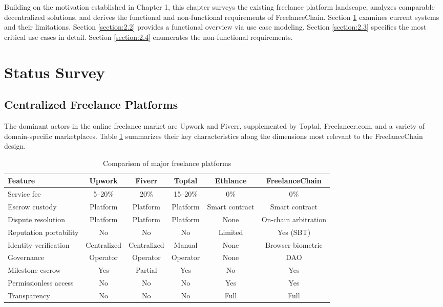 Building on the motivation established in Chapter 1, this chapter surveys the existing freelance platform landscape, analyzes comparable decentralized solutions, and derives the functional and non-functional requirements of FreelanceChain. Section \ref{section:2.1} examines current systems and their limitations. Section \ref{section:2.2} provides a functional overview via use case modeling. Section \ref{section:2.3} specifies the most critical use cases in detail. Section \ref{section:2.4} enumerates the non-functional requirements.

\section{Status Survey}
\label{section:2.1}

\subsection{Centralized Freelance Platforms}

The dominant actors in the online freelance market are Upwork and Fiverr, supplemented by Toptal, Freelancer.com, and a variety of domain-specific marketplaces. Table \ref{table:platform_comparison} summarizes their key characteristics along the dimensions most relevant to the FreelanceChain design.

\begin{table}[H]
\centering
\caption{Comparison of major freelance platforms}
\label{table:platform_comparison}
\begin{tabular}{|l|c|c|c|c|c|}
\hline
\textbf{Feature} & \textbf{Upwork} & \textbf{Fiverr} & \textbf{Toptal} & \textbf{Ethlance} & \textbf{FreelanceChain} \\ \hline
Service fee & 5--20\% & 20\% & 15--20\% & 0\% & 0\% \\ \hline
Escrow custody & Platform & Platform & Platform & Smart contract & Smart contract \\ \hline
Dispute resolution & Platform & Platform & Platform & None & On-chain arbitration \\ \hline
Reputation portability & No & No & No & Limited & Yes (SBT) \\ \hline
Identity verification & Centralized & Centralized & Manual & None & Browser biometric \\ \hline
Governance & Operator & Operator & Operator & None & DAO \\ \hline
Milestone escrow & Yes & Partial & Yes & No & Yes \\ \hline
Permissionless access & No & No & No & Yes & Yes \\ \hline
Transparency & No & No & No & Full & Full \\ \hline
\end{tabular}
\end{table}


